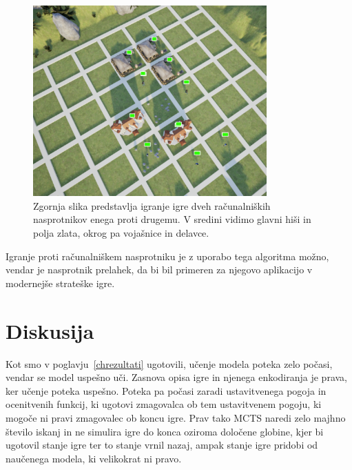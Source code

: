 \documentclass[a4paper, 12pt]{book}
\begin{document}
\begin{figure}[h]
	\begin{center}
		\includegraphics[width=0.8\textwidth]{photos/visualization_ue4.pdf}
	\end{center}
	\caption{Zgornja slika predstavlja igranje igre dveh računalniških nasprotnikov enega proti drugemu. V sredini vidimo glavni hiši in polja zlata, okrog pa vojašnice in delavce. }
	\label{visualization_ue4}
\end{figure}

Igranje proti računalniškem nasprotniku je z uporabo tega algoritma možno, vendar je nasprotnik prelahek, da bi bil primeren za njegovo aplikacijo v modernejše strateške igre.


\chapter{Diskusija}
\label{chdiskusija}

Kot smo v poglavju~\ref{chrezultati} ugotovili, učenje modela poteka zelo počasi, vendar se model uspešno uči.
Zasnova opisa igre in njenega enkodiranja je prava, ker učenje poteka uspešno.
Poteka pa počasi zaradi ustavitvenega pogoja in ocenitvenih funkcij, ki ugotovi zmagovalca ob tem ustavitvenem pogoju, ki mogoče ni pravi zmagovalec ob koncu igre.
Prav tako MCTS naredi zelo majhno število iskanj in ne simulira igre do konca oziroma določene globine, kjer bi ugotovil stanje igre ter to stanje vrnil nazaj, ampak stanje igre pridobi od naučenega modela, ki velikokrat ni pravo.
\end{document}
